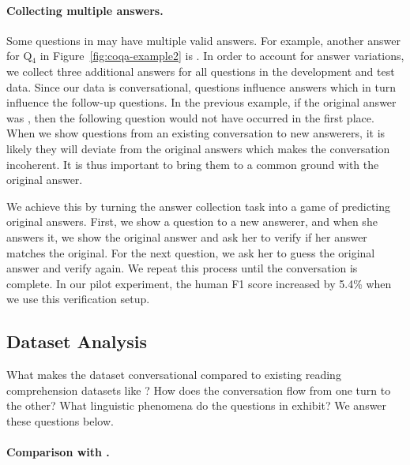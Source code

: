 \paragraph{Collecting multiple answers.} Some questions in  may have multiple valid answers. For example, another answer for Q$_4$ in Figure~\ref{fig:coqa-example2} is . In order to account for answer variations, we collect three additional answers for all questions in the development and test data. Since our data is conversational, questions influence answers which in turn influence the follow-up questions. In the previous example, if the original answer was , then the following question  would not have occurred in the first place. When we show questions from an existing conversation to new answerers, it is likely they will deviate from the original answers which makes the conversation incoherent. It is thus important to bring them to a common ground with the original answer.

We achieve this by turning the answer collection task into a game of predicting original answers.
First, we show a question to a new answerer, and when she answers it, we show the original answer and ask her to verify if her answer matches the original.
For the next question, we ask her to guess the original answer and verify again.
We repeat this process until the conversation is complete.
In our pilot experiment, the human F1 score increased by 5.4\% when we use this verification setup.


\subsection{Dataset Analysis}
\label{sec:coqa-data-analysis}

What makes the  dataset conversational compared to existing reading comprehension datasets like ? How does the conversation flow from one turn to the other? What linguistic phenomena do the questions in  exhibit? We answer these questions below.

\paragraph{Comparison with .}

